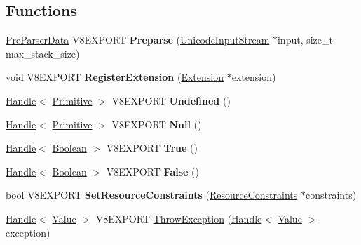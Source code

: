 \subsection*{Functions}
\begin{DoxyCompactItemize}
\item 
\hypertarget{namespacev8_a60529eae9a307e776559503f563436ed}{}\hyperlink{classv8_1_1_pre_parser_data}{Pre\+Parser\+Data} V8\+E\+X\+P\+O\+R\+T {\bfseries Preparse} (\hyperlink{classv8_1_1_unicode_input_stream}{Unicode\+Input\+Stream} $\ast$input, size\+\_\+t max\+\_\+stack\+\_\+size)\label{namespacev8_a60529eae9a307e776559503f563436ed}

\item 
\hypertarget{namespacev8_a7cbab71dcaa41657f6784aa76d01b8f6}{}void V8\+E\+X\+P\+O\+R\+T {\bfseries Register\+Extension} (\hyperlink{classv8_1_1_extension}{Extension} $\ast$extension)\label{namespacev8_a7cbab71dcaa41657f6784aa76d01b8f6}

\item 
\hypertarget{namespacev8_ad39cfade81e77137fc11ff3a24284340}{}\hyperlink{classv8_1_1_handle}{Handle}$<$ \hyperlink{classv8_1_1_primitive}{Primitive} $>$ V8\+E\+X\+P\+O\+R\+T {\bfseries Undefined} ()\label{namespacev8_ad39cfade81e77137fc11ff3a24284340}

\item 
\hypertarget{namespacev8_aa6bb9749edb4ef25314964762bc4d5e8}{}\hyperlink{classv8_1_1_handle}{Handle}$<$ \hyperlink{classv8_1_1_primitive}{Primitive} $>$ V8\+E\+X\+P\+O\+R\+T {\bfseries Null} ()\label{namespacev8_aa6bb9749edb4ef25314964762bc4d5e8}

\item 
\hypertarget{namespacev8_a9201601bde0d0b9bd26e474d841e2710}{}\hyperlink{classv8_1_1_handle}{Handle}$<$ \hyperlink{classv8_1_1_boolean}{Boolean} $>$ V8\+E\+X\+P\+O\+R\+T {\bfseries True} ()\label{namespacev8_a9201601bde0d0b9bd26e474d841e2710}

\item 
\hypertarget{namespacev8_a06ef84e71fefe9af11b127b632bb7527}{}\hyperlink{classv8_1_1_handle}{Handle}$<$ \hyperlink{classv8_1_1_boolean}{Boolean} $>$ V8\+E\+X\+P\+O\+R\+T {\bfseries False} ()\label{namespacev8_a06ef84e71fefe9af11b127b632bb7527}

\item 
\hypertarget{namespacev8_a6a08a0e1cf070f360fc8ea2834737039}{}bool V8\+E\+X\+P\+O\+R\+T {\bfseries Set\+Resource\+Constraints} (\hyperlink{classv8_1_1_resource_constraints}{Resource\+Constraints} $\ast$constraints)\label{namespacev8_a6a08a0e1cf070f360fc8ea2834737039}

\item 
\hyperlink{classv8_1_1_handle}{Handle}$<$ \hyperlink{classv8_1_1_value}{Value} $>$ V8\+E\+X\+P\+O\+R\+T \hyperlink{namespacev8_a2469af0ac719d39f77f20cf68dd9200e}{Throw\+Exception} (\hyperlink{classv8_1_1_handle}{Handle}$<$ \hyperlink{classv8_1_1_value}{Value} $>$ exception)
\end{DoxyCompactItemize}



